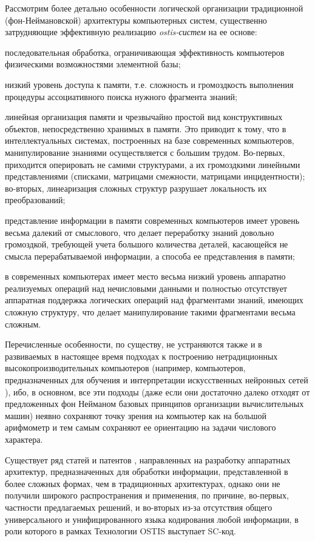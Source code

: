 Рассмотрим более детально особенности логической организации традиционной (фон-Неймановской) архитектуры компьютерных систем, существенно затрудняющие эффективную реализацию \textit{ostis-систем} на ее основе:
\begin{textitemize}
	\item последовательная обработка, ограничивающая эффективность компьютеров физическими возможностями элементной базы;
	\item низкий уровень доступа к памяти, т.е. сложность и громоздкость выполнения процедуры ассоциативного поиска нужного фрагмента знаний; 
	\item линейная организация памяти и чрезвычайно простой вид конструктивных объектов, непосредственно хранимых в памяти. Это приводит к тому, что в интеллектуальных системах, построенных на базе современных компьютеров, манипулирование знаниями осуществляется с большим трудом. Во-первых, приходится оперировать не самими структурами, а их громоздкими линейными представлениями (списками, матрицами смежности, матрицами инцидентности); во-вторых, линеаризация сложных структур разрушает локальность их преобразований;
	\item представление информации в памяти современных компьютеров имеет уровень весьма далекий от смыслового, что делает переработку знаний довольно громоздкой, требующей учета большого количества деталей, касающейся не смысла перерабатываемой информации, а способа ее представления в памяти;
	\item в современных компьютерах имеет место весьма низкий уровень аппаратно реализуемых операций над нечисловыми данными и полностью отсутствует аппаратная поддержка логических операций над фрагментами знаний, имеющих сложную структуру, что делает манипулирование такими фрагментами весьма сложным.
\end{textitemize}

Перечисленные особенности, по существу, не устраняются также и в развиваемых в настоящее время подходах к построению нетрадиционных высокопроизводительных компьютеров (например, компьютеров, предназначенных для обучения и интерпретации искусственных нейронных сетей \cite{Neurocomputers,USB_Accelerator}), ибо, в основном, все эти подходы (даже если они достаточно далеко отходят от предложенных фон Нейманом базовых принципов организации вычислительных машин) неявно сохраняют точку зрения на компьютер как на большой арифмометр и тем самым сохраняют ее ориентацию на задачи числового характера.

Существует ряд статей \cite{Tran2018,Shi2018,Lu2021,Afanasyev2021,Zhang2017,Hu2021,Minati2019,Song2016} и патентов \cite{Somsubhra_2006,Allen_1989,Moussa_2013}, направленных на разработку аппаратных архитектур, предназначенных для обработки информации, представленной в более сложных формах, чем в традиционных архитектурах, однако они не получили широкого распространения и применения, по причине, во-первых, частности предлагаемых решений, и во-вторых из-за отсутствия общего универсального и унифицированного языка кодирования любой информации, в роли которого в рамках Технологии OSTIS выступает SC-код.

